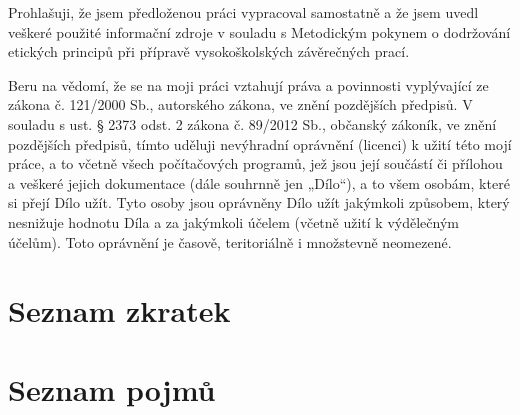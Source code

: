 \documentclass[czech,bachelor,unicode]{ctufit-thesis}
\begin{document}
\begin{declarationpage}
Prohlašuji, že jsem předloženou práci vypracoval samostatně a že jsem uvedl veškeré použité
informační zdroje v souladu s Metodickým pokynem o dodržování etických principů při přípravě
vysokoškolských závěrečných prací.

Beru na vědomí, že se na moji práci vztahují práva a povinnosti vyplývající ze zákona č. 121/2000 Sb.,
autorského zákona, ve znění pozdějších předpisů. V souladu s ust. § 2373 odst. 2 zákona č. 89/2012
Sb., občanský zákoník, ve znění pozdějších předpisů, tímto uděluji nevýhradní oprávnění (licenci) k
užití této mojí práce, a to včetně všech počítačových programů, jež jsou její součástí či přílohou a
veškeré jejich dokumentace (dále souhrnně jen „Dílo“), a to všem osobám, které si přejí Dílo užít. Tyto
osoby jsou oprávněny Dílo užít jakýmkoli způsobem, který nesnižuje hodnotu Díla a za jakýmkoli
účelem (včetně užití k výdělečným účelům). Toto oprávnění je časově, teritoriálně i množstevně
neomezené.
\end{declarationpage}
\newcommand{\term}[1]{{\fontfamily{qcr}\selectfont #1}}
\printabstractpage %
\chapter{Seznam zkratek}

\chapter{Seznam pojmů}

\mainmatter\mainmatterinit %

\appendix\appendixinit %
\backmatter %
\printbibliography %
\end{document}
